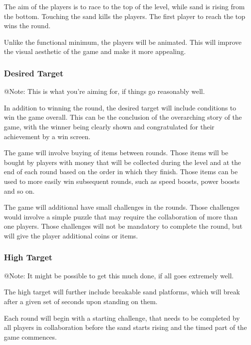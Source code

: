 The aim of the players is to race to the top of the level, while sand is rising from the bottom. Touching the sand kills the players. The first player to reach the top wins the round.
    
Unlike the functional minimum, the players will be animated. This will improve the visual aesthetic of the game and make it more appealing.

\subsubsection{Desired Target}

\begin{TempText}
	@Note: This is what you're aiming for, if things go reasonably well.
\end{TempText}

In addition to winning the round, the desired target will include conditions to win the game overall. This can be the conclusion of the overarching story of the game, with the winner being clearly shown and congratulated for their achievement by a win screen.

The game will involve buying of items between rounds. Those items will be bought by players with money that will be collected during the level and at the end of each round based on the order in which they finish. Those items can be used to more easily win subsequent rounds, such as speed boosts, power boosts and so on.

The game will additional have small challenges in the rounds. Those challenges would involve a simple puzzle that may require the collaboration of more than one players. Those challenges will not be mandatory to complete the round, but will give the player additional coins or items.

\subsubsection{High Target}

\begin{TempText}
	@Note: It might be possible to get this much done, if all goes extremely well.
\end{TempText}

The high target will further include breakable sand platforms, which will break after a given set of seconds upon standing on them.

Each round will begin with a starting challenge, that needs to be completed by all players in collaboration before the sand starts rising and the timed part of the game commences.

